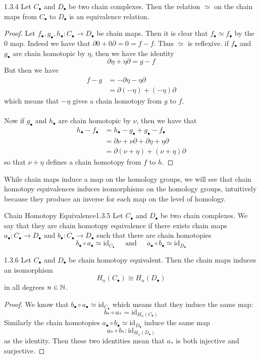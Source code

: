 \documentclass[a4paper]{article}
\begin{document}
\begin{lmm}{}{1.3.4} Let $C_\bullet$ and $D_\bullet$ be two chain complexes. Then the relation $\simeq$ on the chain maps from $C_\bullet$ to $D_\bullet$ is an equivalence relation. \tcbline
\begin{proof}
Let $f_\bullet,g_\bullet,h_\bullet:C_\bullet\to D_\bullet$ be chain maps. Then it is clear that $f_\bullet\simeq f_\bullet$ by the $0$ map. Indeed we have that $\partial 0+0\partial=0=f-f$. Thus $\simeq$ is reflexive. if $f_\bullet$ and $g_\bullet$ are chain homotopic by $\eta$, then we have the identity $$\partial\eta+\eta\partial=g-f$$ But then we have 
\begin{align*}
f-g&=-\partial\eta-\eta\partial\\
&=\partial(-\eta)+(-\eta)\partial
\end{align*}
which means that $-\eta$ gives a chain homotopy from $g$ to $f$. \\~\\

Now if $g_\bullet$ and $h_\bullet$ are chain homotopic by $\nu$, then we have that 
\begin{align*}
h_\bullet-f_\bullet&=h_\bullet-g_\bullet+g_\bullet-f_\bullet\\
&=\partial\nu+\nu\partial+\partial\eta+\eta\partial\\
&=\partial(\nu+\eta)+(\nu+\eta)\partial
\end{align*}
so that $\nu+\eta$ defines a chain homotopy from $f$ to $h$. 
\end{proof}
\end{lmm}

While chain maps induce a map on the homology groups, we will see that chain homotopy equivalences induces isomorphisms on the homology groups, intuitively because they produce an inverse for each map on the level of homology. 

\begin{defn}{Chain Homotopy Equivalence}{1.3.5} Let $C_\bullet$ and $D_\bullet$ be two chain complexes. We say that they are chain homotopy equivalence if there exists chain maps $a_\bullet:C_\bullet\to D_\bullet$ and $b_\bullet:C_\bullet\to D_\bullet$ such that there are chain homotopies $$b_\bullet\circ a_\bullet\simeq\text{id}_{C_\bullet}\;\;\;\;\text{ and }\;\;\;\;a_\bullet\circ b_\bullet\simeq\text{id}_{D_\bullet}$$
\end{defn}

\begin{lmm}{}{1.3.6} Let $C_\bullet$ and $D_\bullet$ be chain homotopy equivalent. Then the chain maps induces an isomorphism $$H_n(C_\bullet)\cong H_n(D_\bullet)$$ in all degrees $n\in\mathbb{N}$. \tcbline
\begin{proof}
We know that $b_\bullet\circ a_\bullet\simeq\text{id}_{C_\bullet}$ which means that they induce the same map: $$b_\ast\circ a_\ast=\text{id}_{H_n(C_\bullet)}$$ Similarly the chain homotopies $a_\bullet\circ b_\bullet\simeq\text{id}_{D_\bullet}$ induce the same map $$a_\ast\circ b_\ast:\text{id}_{H_n(D_\bullet)}$$ as the identity. Then these two identities mean that $a_\ast$ is both injective and surjective. 
\end{proof}
\end{lmm}
\end{document}
